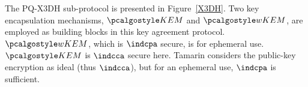 The PQ-X3DH sub-protocol is presented in Figure~\ref{X3DH}. Two key 
encapsulation mechanisms, $\KEM$ and $\wKEM$, are employed as building blocks 
in this key agreement protocol. $\wKEM$, which is $\indcpa$ secure, is for 
ephemeral use. $\KEM$ is $\indcca$ secure here. Tamarin considers the 
public-key encryption as ideal (thus $\indcca$), but for an ephemeral use, 
$\indcpa$ is sufficient.

%





